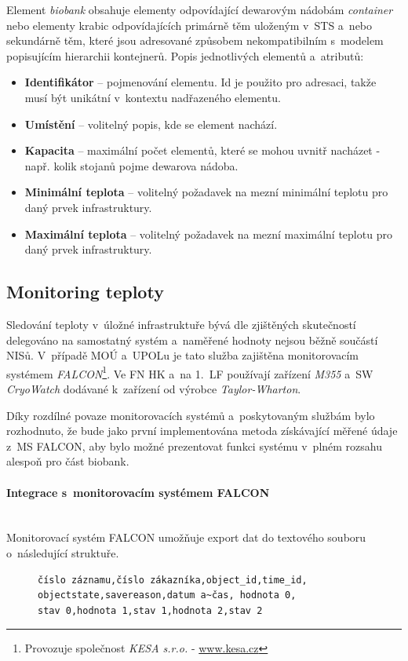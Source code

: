 \documentclass[11pt, draft, oneside]{fithesis2}
\newcommand{\polozka}[1]{\item {\bf #1}\xspace}
\newcommand{\paragraphNewLine}[1]{\paragraph*{#1}\mbox{}\\}
\begin{document}
Element \textit{biobank} obsahuje elementy odpovídající dewarovým nádobám \textit{container} nebo elementy  krabic odpovídajících primárně těm uloženým v~STS a~nebo sekundárně těm, které jsou adresované způsobem nekompatibilním s~modelem popisujícím hierarchii kontejnerů. Popis jednotlivých elementů a~atributů:

\begin{itemize}

\polozka{{Identifikátor}} -- pojmenování elementu. Id je použito pro adresaci, takže musí být unikátní v~kontextu nadřazeného elementu.

\polozka{{Umístění}} -- volitelný popis, kde se element nachází.

\polozka{{Kapacita}} -- maximální počet elementů, které se mohou uvnitř nacházet - např. kolik stojanů pojme dewarova nádoba.

\polozka{{Minimální teplota}} -- volitelný požadavek na mezní minimální teplotu pro daný prvek infrastruktury.

\polozka{{Maximální teplota}} -- volitelný požadavek na mezní maximální teplotu pro daný prvek infrastruktury.

\end{itemize}

\subsection{Monitoring teploty}
Sledování teploty v~úložné infrastruktuře bývá dle zjištěných skutečností delegováno na samostatný systém a~naměřené hodnoty nejsou běžně součástí NISů. 
V~případě MOÚ a~UPOLu je tato služba zajištěna monitorovacím systémem \textit{FALCON}\footnote{Provozuje společnost \textit{KESA s.r.o.} - \url{www.kesa.cz}}. Ve FN HK a~na 1.~LF používají zařízení \textit{M355} a~SW \textit{CryoWatch} dodávané k~zařízení od výrobce \textit{Taylor-Wharton}. 

Díky rozdílné povaze monitorovacích systémů a~poskytovaným službám bylo rozhodnuto, že bude jako první implementována metoda získávající měřené údaje z~MS FALCON, aby bylo možné prezentovat funkci systému v~plném rozsahu alespoň pro část biobank.

\paragraphNewLine{Integrace s~monitorovacím systémem FALCON}
Monitorovací systém FALCON umožňuje export dat do textového souboru o~následující struktuře.

\begin{figure}[h!]
\centering
\begin{BVerbatim}
číslo záznamu,číslo zákazníka,object_id,time_id,
objectstate,savereason,datum a~čas, hodnota 0,
stav 0,hodnota 1,stav 1,hodnota 2,stav 2
\end{BVerbatim}
\end{figure}
\end{document}
